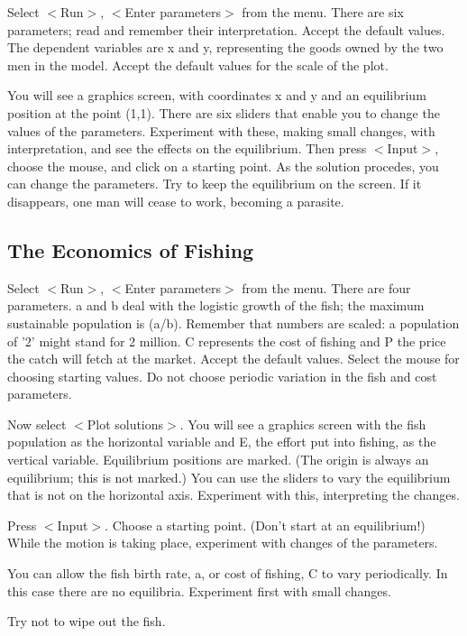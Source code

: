    Select $<$Run$>$, $<$Enter parameters$>$ from the menu. There are six
parameters; read and remember their interpretation. Accept the default
values. The dependent variables are x and y, representing the goods
owned by the two men in the model. Accept the default values for the
scale of the plot.

   You will see a graphics screen, with coordinates x and y and an
equilibrium position at the point (1,1). There are six sliders that
enable you to change the values of the parameters. Experiment with
these, making small changes, with interpretation, and see the effects
on the equilibrium. Then press $<$Input$>$, choose the mouse, and click on a
starting point. As the solution procedes, you can change the parameters.
Try to keep the equilibrium on the screen. If it disappears, one man will
cease to work, becoming a parasite.



\subsection{The Economics of Fishing}

   Select $<$Run$>$, $<$Enter parameters$>$ from the menu. There are four
parameters. a and b deal with the logistic growth of the fish; the
maximum sustainable population is (a/b). Remember that numbers are
scaled: a population of '2' might stand for 2 million. C represents the
cost of fishing and P the price the catch will fetch at the market.
Accept the default values. Select the mouse for choosing starting
values. Do not choose periodic variation in the fish and cost parameters.

   Now select $<$Plot solutions$>$. You will see a graphics screen with the
fish population as the horizontal variable and E, the effort put
into fishing, as the vertical variable. Equilibrium positions are marked.
(The origin is always an equilibrium; this is not marked.) You can use
the sliders to vary the equilibrium that is not on the horizontal axis.
Experiment with this, interpreting the changes.

   Press $<$Input$>$. Choose a starting point. (Don't start at an
equilibrium!) While the motion is taking place, experiment with
changes of the parameters.

   You can allow the fish birth rate, a, or cost of fishing, C to vary
periodically. In this case there are no equilibria. Experiment
first with small changes.

      Try not to wipe out the fish.


